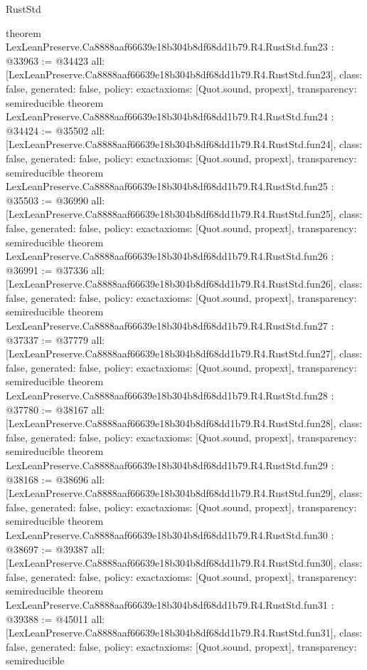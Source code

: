 \begin{lexlean}{RustStd}
\begin{coremodule}
{}
theorem LexLeanPreserve.Ca8888aaf66639e18b304b8df68dd1b79.R4.RustStd.fun23 : @33963 := @34423 {
  all: [LexLeanPreserve.Ca8888aaf66639e18b304b8df68dd1b79.R4.RustStd.fun23],
  class: false,
  generated: false,
  policy: exact{axioms: [Quot.sound, propext]},
  transparency: semireducible
}
theorem LexLeanPreserve.Ca8888aaf66639e18b304b8df68dd1b79.R4.RustStd.fun24 : @34424 := @35502 {
  all: [LexLeanPreserve.Ca8888aaf66639e18b304b8df68dd1b79.R4.RustStd.fun24],
  class: false,
  generated: false,
  policy: exact{axioms: [Quot.sound, propext]},
  transparency: semireducible
}
theorem LexLeanPreserve.Ca8888aaf66639e18b304b8df68dd1b79.R4.RustStd.fun25 : @35503 := @36990 {
  all: [LexLeanPreserve.Ca8888aaf66639e18b304b8df68dd1b79.R4.RustStd.fun25],
  class: false,
  generated: false,
  policy: exact{axioms: [Quot.sound, propext]},
  transparency: semireducible
}
theorem LexLeanPreserve.Ca8888aaf66639e18b304b8df68dd1b79.R4.RustStd.fun26 : @36991 := @37336 {
  all: [LexLeanPreserve.Ca8888aaf66639e18b304b8df68dd1b79.R4.RustStd.fun26],
  class: false,
  generated: false,
  policy: exact{axioms: [Quot.sound, propext]},
  transparency: semireducible
}
theorem LexLeanPreserve.Ca8888aaf66639e18b304b8df68dd1b79.R4.RustStd.fun27 : @37337 := @37779 {
  all: [LexLeanPreserve.Ca8888aaf66639e18b304b8df68dd1b79.R4.RustStd.fun27],
  class: false,
  generated: false,
  policy: exact{axioms: [Quot.sound, propext]},
  transparency: semireducible
}
theorem LexLeanPreserve.Ca8888aaf66639e18b304b8df68dd1b79.R4.RustStd.fun28 : @37780 := @38167 {
  all: [LexLeanPreserve.Ca8888aaf66639e18b304b8df68dd1b79.R4.RustStd.fun28],
  class: false,
  generated: false,
  policy: exact{axioms: [Quot.sound, propext]},
  transparency: semireducible
}
theorem LexLeanPreserve.Ca8888aaf66639e18b304b8df68dd1b79.R4.RustStd.fun29 : @38168 := @38696 {
  all: [LexLeanPreserve.Ca8888aaf66639e18b304b8df68dd1b79.R4.RustStd.fun29],
  class: false,
  generated: false,
  policy: exact{axioms: [Quot.sound, propext]},
  transparency: semireducible
}
theorem LexLeanPreserve.Ca8888aaf66639e18b304b8df68dd1b79.R4.RustStd.fun30 : @38697 := @39387 {
  all: [LexLeanPreserve.Ca8888aaf66639e18b304b8df68dd1b79.R4.RustStd.fun30],
  class: false,
  generated: false,
  policy: exact{axioms: [Quot.sound, propext]},
  transparency: semireducible
}
theorem LexLeanPreserve.Ca8888aaf66639e18b304b8df68dd1b79.R4.RustStd.fun31 : @39388 := @45011 {
  all: [LexLeanPreserve.Ca8888aaf66639e18b304b8df68dd1b79.R4.RustStd.fun31],
  class: false,
  generated: false,
  policy: exact{axioms: [Quot.sound, propext]},
  transparency: semireducible
}
\end{coremodule}
\end{lexlean}
